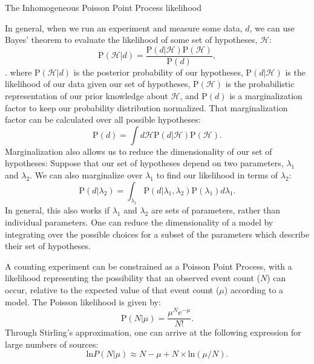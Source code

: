 \documentclass[twocolumn]{aastex631}
\newcommand*{\pprob}{\mathrm{P}}
\begin{document}
\begin{subsection}{The Inhomogeneous Poisson Point Process likelihood}

In general, when we run an experiment and measure some data, $d$,
    we can use Bayes' theorem to evaluate the likelihood of some
    set of hypotheses, $\mathcal{H}$:
\begin{equation}
\label{eq:bayes}
\pprob(\mathcal{H}|d) = \frac{\pprob(d|\mathcal{H}) \pprob(\mathcal{H})}{\pprob(d)},
\end{equation}.
where $\pprob(\mathcal{H}|d)$ is the posterior probability of our hypotheses,
    $\pprob(d|\mathcal{H})$ is the likelihood of our data given our set of hypotheses,
    $\pprob(\mathcal{H})$ is the probabilistic representation of our prior knowledge about
    $\mathcal{H}$, and $\pprob(d)$ is a marginalization factor to keep our probability
    distribution normalized.
That marginalization factor can be calculated over all possible
    hypotheses:
\begin{equation}
\pprob(d) = \int d\mathcal{H} \pprob(d|\mathcal{H}) \pprob(\mathcal{H}).
\end{equation}
Marginalization also allows us to reduce the dimensionality
    of our set of hypotheses:
Suppose that our set of hypotheses depend on two parameters,
    $\lambda_1$ and $\lambda_2$.
We can also marginalize over
    $\lambda_1$ to find our likelihood in terms of $\lambda_2$:
\begin{equation}
\pprob(d | \lambda_2) = \int_{\lambda_1} \pprob(d | \lambda_1, \lambda_2)
    \pprob(\lambda_1) d\lambda_1.
\end{equation}
In general, this also works if $\lambda_1$ and $\lambda_2$
    are sets of parameters, rather than individual parameters.
One can reduce the dimensionality of a model by integrating over
    the possible choices for a subset of the parameters
    which describe their set of hypotheses.

A counting experiment can be constrained as a Poisson Point Process,
    with a likelihood representing the possibility that an observed event count
    ($N$) can occur,
    relative to the expected value of that event count ($\mu$)
    according to a model.
The Poisson likelihood is given by:
\begin{equation}
\label{eq:poisson}
\pprob(N|\mu) = \frac{\mu^{N} e^{-\mu}}{N!}.
\end{equation}
Through Stirling's approximation, one can arrive at the following expression
    for large numbers of sources:
\begin{equation}
\label{eq:sterling}
\mathrm{ln}P(N|\mu) \approx N - \mu + N \times \mathrm{ln}(\mu/N).
\end{equation}


\end{subsection}
\end{document}
